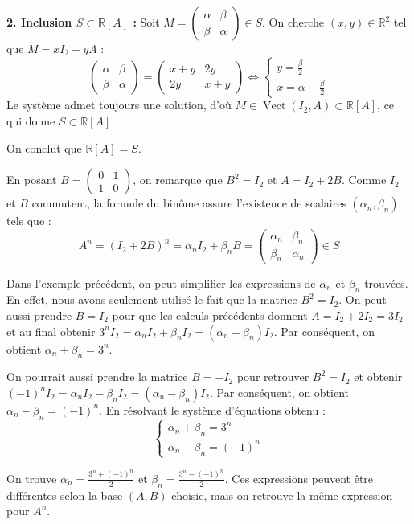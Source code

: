 \documentclass[11pt,a4paper]{report}
\begin{document}
\begin{example}
    \medskip
    \textbf{2. Inclusion $S \subset \mathbb{R}[A]$ :}
    Soit $M = \begin{pmatrix} \alpha & \beta \\ \beta & \alpha \end{pmatrix} \in S$. On cherche $(x,y) \in \mathbb{R}^2$ tel que $M = x I_2 + y A$ :
    \[
        \begin{pmatrix} \alpha & \beta \\ \beta & \alpha \end{pmatrix} = \begin{pmatrix} x + y & 2y \\ 2y & x + y \end{pmatrix}
        \iff 
        \begin{cases}
            y = \frac{\beta}{2} \\
            x = \alpha - \frac{\beta}{2}
        \end{cases}
    \]
    Le système admet toujours une solution, d'où $M \in \operatorname{Vect}(I_2, A) \subset \mathbb{R}[A]$, ce qui donne $S \subset \mathbb{R}[A]$.
    
    On conclut que $\mathbb{R}[A] = S$.
\end{example}

\begin{remark}
    En posant $B = \begin{pmatrix} 0 & 1 \\ 1 & 0 \end{pmatrix}$, on remarque que $B^2 = I_2$ et $A = I_2 + 2B$. 
    Comme $I_2$ et $B$ commutent, la formule du binôme assure l'existence de scalaires $(\alpha_n, \beta_n)$ tels que :
    \[
        A^n = (I_2 + 2B)^n = \alpha_n I_2 + \beta_n B = \begin{pmatrix} \alpha_n & \beta_n \\ \beta_n & \alpha_n \end{pmatrix} \in S
    \]

    Dans l'exemple précédent, on peut simplifier les expressions de $\alpha_n$ et $\beta_n$ trouvées. En effet, nous avons seulement utilisé le fait que la matrice $B^2 = I_2$. On peut aussi prendre $B = I_2$ pour que les calculs précédents donnent $A = I_2 + 2I_2 = 3I_2$ et au final obtenir $3^n I_2 = \alpha_n I_2 + \beta_n I_2 = (\alpha_n + \beta_n)I_2$. Par conséquent, on obtient $\alpha_n + \beta_n = 3^n$.

    On pourrait aussi prendre la matrice $B = -I_2$ pour retrouver $B^2 = I_2$ et obtenir $(-1)^n I_2 = \alpha_n I_2 - \beta_n I_2 = (\alpha_n - \beta_n)I_2$. Par conséquent, on obtient $\alpha_n - \beta_n = (-1)^n$. En résolvant le système d'équations obtenu :
    $$\begin{cases} \alpha_n + \beta_n = 3^n \\ \alpha_n - \beta_n = (-1)^n\end{cases}$$

    On trouve $\alpha_n = \frac{3^n + (-1)^n}{2}$ et $\beta_n = \frac{3^n - (-1)^n}{2}$. Ces expressions peuvent être différentes selon la base $(A,B)$ choisie, mais on retrouve la même expression pour $A^n$.
\end{remark}
\end{document}
